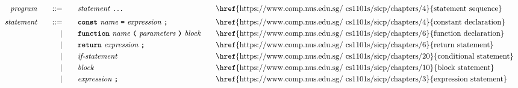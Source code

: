 







\begin{alignat*}{9}
&& \textit{program}    &&\quad ::= &\quad && \textit{statement} \ \ldots
                                                           && \textrm{\href{https://www.comp.nus.edu.sg/~cs1101s/sicp/chapters/4}{statement sequence}} \\[1mm]
&& \textit{statement}    &&\quad ::= &\quad && \textbf{\texttt{const}}\  \textit{name} \ 
                                           \textbf{\texttt{=}}\  \textit{expression} \ \textbf{\texttt{;}}
                                                           && \textrm{\href{https://www.comp.nus.edu.sg/~cs1101s/sicp/chapters/4}{constant declaration}} \\
&&                       && |   &\quad && \textbf{\texttt{function}}\  \textit{name} \ 
                                   \textbf{\texttt{(}}\  \textit{parameters} \ \textbf{\texttt{)}}\ \textit{block} \quad
                                                           && \textrm{\href{https://www.comp.nus.edu.sg/~cs1101s/sicp/chapters/6}{function declaration}}\\
&&                       && |   &\quad && \textbf{\texttt{return}}\  \textit{expression} \ \textbf{\texttt{;}}
                                                           && \textrm{\href{https://www.comp.nus.edu.sg/~cs1101s/sicp/chapters/6}{return statement}}\\
&&                       && |   &\quad && \textit{if-statement} \quad
                                                           && \textrm{\href{https://www.comp.nus.edu.sg/~cs1101s/sicp/chapters/20}{conditional statement}}\\
&&                       && |   &\quad &&  \textit{block} 
                                                           && \textrm{\href{https://www.comp.nus.edu.sg/~cs1101s/sicp/chapters/10}{block statement}}\\
&&                       && |   &\quad &&  \textit{expression} \ \textbf{\texttt{;}}
                                                           && \textrm{\href{https://www.comp.nus.edu.sg/~cs1101s/sicp/chapters/3}{expression statement}} \\[1mm]

\end{alignat*}
